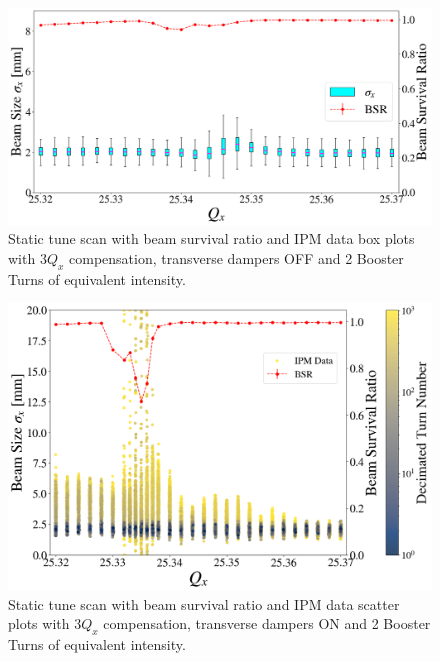 \begin{figure}[H]
    \centering
    \includegraphics[width=\columnwidth]{chapter6/static2turns_ipm_dampersOFF.png}
    \caption{Static tune scan with beam survival ratio and IPM data box plots with $3Q_x$ compensation, transverse dampers OFF and 2 Booster Turns of equivalent intensity.}
    \label{fig:static2_dampersOFF}
\end{figure}

\begin{figure}[H]
    \centering
    \includegraphics[width=\columnwidth]{chapter6/static2turns_dampersON.png}
    \caption{Static tune scan with beam survival ratio and IPM data scatter plots with $3Q_x$ compensation, transverse dampers ON and 2 Booster Turns of equivalent intensity.}
    \label{fig:static2_scatter_dampersON}
\end{figure}